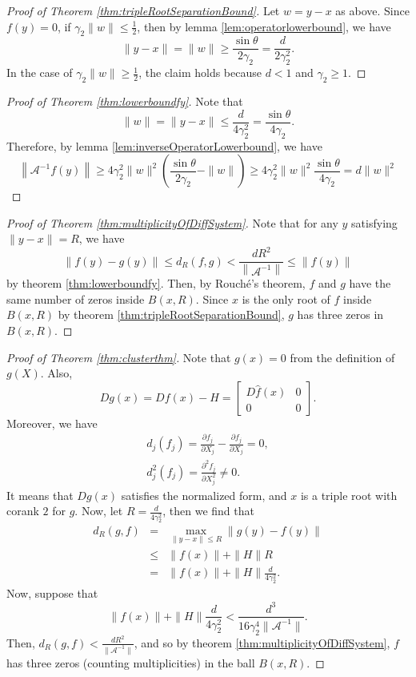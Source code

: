 \documentclass[12pt,oneside,reqno]{amsart}
\theoremstyle{definition}
\begin{document}
\begin{proof}[Proof of Theorem \ref{thm:tripleRootSeparationBound}]
	Let $w=y-x$ as above. Since $f(y)=0$, if $\gamma_2\|w\|\leq \frac{1}{2}$, then by lemma \ref{lem:operatorlowerbound}, we have
	\[\|y-x\|=\|w\|\geq\frac{\sin\theta}{2\gamma_2}=\frac{d}{2\gamma_2^2} .\]
	In the case of $\gamma_2\|w\|\geq \frac{1}{2}$, the claim holds because $d<1$ and $\gamma_2\geq 1$.
\end{proof}
\begin{proof}[Proof of Theorem \ref{thm:lowerboundfy}]
	Note that 
	\[\|w\|=\|y-x\|\leq \frac{d}{4\gamma_2^2}=\frac{\sin\theta}{4\gamma_2}.\]
	Therefore, by lemma \ref{lem:inverseOperatorLowerbound}, we have
	\[\left\|\mathcal{A}^{-1}f(y)\right\|\geq 4\gamma_2^2\|w\|^2\left(\frac{\sin\theta}{2\gamma_2}-\|w\|\right)\geq4\gamma_2^2\|w\|^2\frac{\sin\theta}{4\gamma_2}=d\|w\|^2\]
\end{proof}
\begin{proof}[Proof of Theorem \ref{thm:multiplicityOfDiffSystem}]
	Note that for any $y$ satisfying $\|y-x\|=R$, we have
	\[\|f(y)-g(y)\|\leq d_R(f,g)<\frac{dR^2}{\left\|\mathcal{A}^{-1}\right\|}\leq \|f(y)\|\]
	by theorem \ref{thm:lowerboundfy}. Then, by Rouch\'e's theorem, $f$ and $g$ have the same number of zeros inside $B(x,R)$. Since $x$ is the only root of $f$ inside $B(x,R)$ by theorem \ref{thm:tripleRootSeparationBound}, $g$ has three zeros in $B(x,R)$.
\end{proof}
\begin{proof}[Proof of Theorem \ref{thm:clusterthm}]
	Note that $g(x)=0$ from the definition of $g(X)$. Also, 
	\[Dg(x)=Df(x)-H=\begin{bmatrix}
	D\hat{f}(x) & 0 \\
	0 & 0
	\end{bmatrix}.\]
	Moreover, we have 
	\begin{eqnarray*}
	d_j(f_j) = \frac{\partial f_{j}}{\partial X_j} - \frac{\partial f_{j}}{\partial X_j} = 0,\\
	d_j^2(f_j) = \frac{\partial^2 f_{j}}{\partial X_j^2}\ne 0.
	\end{eqnarray*}
	It means that $Dg(x)$ satisfies the normalized form, and $x$ is a triple root with corank $2$ for $g$. Now, let $R=\frac{d}{4\gamma_2^2}$, then we find that 
	\begin{eqnarray*}
	d_R(g,f)&=&\max\limits_{\|y-x\|\leq R}\|g(y)-f(y)\|\\
	& \leq & \|f(x)\|+\|H\|R\\
	& = & \|f(x)\|+\|H\|\frac{d}{4\gamma_2^2}.
	\end{eqnarray*}
	Now, suppose that 
	\[\|f(x)\|+\|H\|\frac{d}{4\gamma_2^2}<\frac{d^3}{16\gamma_2^4\|\mathcal{A}^{-1}\|}.\]
	Then, $d_R(g,f)< \frac{dR^2}{\|\mathcal{A}^{-1}\|}$, and so by theorem \ref{thm:multiplicityOfDiffSystem}, $f$ has three zeros (counting multiplicities) in the ball $B(x,R)$.
\end{proof}


	
\end{document}

